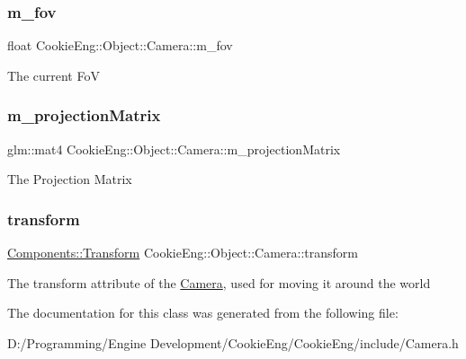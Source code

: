 \subsubsection{\texorpdfstring{m\+\_\+fov}{m\_fov}}
{\footnotesize\ttfamily float Cookie\+Eng\+::\+Object\+::\+Camera\+::m\+\_\+fov\hspace{0.3cm}{\ttfamily [protected]}}

The current FoV \mbox{\label{class_cookie_eng_1_1_object_1_1_camera_a6a5152fd8fbd92c4cbcc73d14511e584}} 
\subsubsection{\texorpdfstring{m\+\_\+projection\+Matrix}{m\_projectionMatrix}}
{\footnotesize\ttfamily glm\+::mat4 Cookie\+Eng\+::\+Object\+::\+Camera\+::m\+\_\+projection\+Matrix\hspace{0.3cm}{\ttfamily [protected]}}

The Projection Matrix \mbox{\label{class_cookie_eng_1_1_object_1_1_camera_aa996e685c79a71bd30e88341b68ed197}} 
\subsubsection{\texorpdfstring{transform}{transform}}
{\footnotesize\ttfamily \hyperlink{class_cookie_eng_1_1_components_1_1_transform}{Components\+::\+Transform} Cookie\+Eng\+::\+Object\+::\+Camera\+::transform}

The transform attribute of the \hyperlink{class_cookie_eng_1_1_object_1_1_camera}{Camera}, used for moving it around the world 

The documentation for this class was generated from the following file\+:\begin{DoxyCompactItemize}
\item 
D\+:/\+Programming/\+Engine Development/\+Cookie\+Eng/\+Cookie\+Eng/include/Camera.\+h\end{DoxyCompactItemize}

